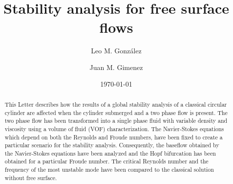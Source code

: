 \documentclass[%
 reprint,
 amsmath,amssymb,
 aps,
prl
]{revtex4-1}
\begin{document}

\title{Stability analysis for free surface flows}


\author{Leo M. Gonz\'alez}
%

\author{Juan M. Gimenez}
%

\date{\today}%
             
\begin{abstract}
This Letter describes how the results of a global stability analysis of a classical circular cylinder are affected when the cylinder submerged and a two phase flow is present. The two phase flow has been transformed into a single phase fluid with variable density and viscosity using a volume of fluid (VOF) characterization. The Navier-Stokes equations which depend on both the Reynolds and Froude numbers, have been fixed to create a particular scenario for the stability analysis. Consequently, the baseflow obtained by the Navier-Stokes equations have been analyzed and the Hopf bifurcation has been obtained for a particular Froude number. The critical Reynolds number and the frequency of the most unstable mode have been compared to the classical solution without free surface.
\end{abstract}
\end{document}
